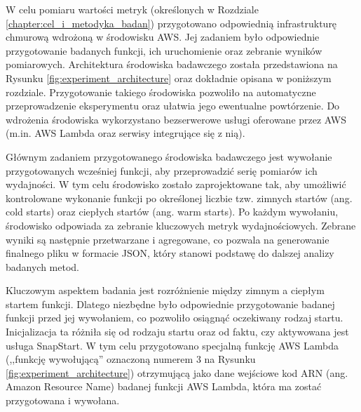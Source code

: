 W celu pomiaru wartości metryk (określonych w Rozdziale \ref{chapter:cel_i_metodyka_badan}) przygotowano odpowiednią infrastrukturę chmurową wdrożoną w środowisku AWS.
Jej zadaniem było odpowiednie przygotowanie badanych funkcji, ich uruchomienie oraz zebranie wyników pomiarowych.
Architektura środowiska badawczego została przedstawiona na Rysunku \ref{fig:experiment_architecture} oraz dokładnie opisana w poniższym rozdziale.
Przygotowanie takiego środowiska pozwoliło na automatyczne przeprowadzenie eksperymentu oraz ułatwia jego ewentualne powtórzenie.
Do wdrożenia środowiska wykorzystano bezserwerowe usługi oferowane przez AWS (m.in. AWS Lambda oraz serwisy integrujące się z nią).

Głównym zadaniem przygotowanego środowiska badawczego jest wywołanie przygotowanych wcześniej funkcji, aby przeprowadzić serię pomiarów ich wydajności.
W tym celu środowisko zostało zaprojektowane tak, aby umożliwić kontrolowane wykonanie funkcji po określonej liczbie tzw. zimnych startów (ang. cold starts) oraz ciepłych startów (ang. warm starts). 
Po każdym wywołaniu, środowisko odpowiada za zebranie kluczowych metryk wydajnościowych. 
Zebrane wyniki są następnie przetwarzane i agregowane, co pozwala na generowanie finalnego pliku w formacie JSON, który stanowi podstawę do dalszej analizy badanych metod.

Kluczowym aspektem badania jest rozróżnienie między zimnym a ciepłym startem funkcji.
Dlatego niezbędne było odpowiednie przygotowanie badanej funkcji przed jej wywołaniem, co pozwoliło osiągnąć oczekiwany rodzaj startu.
Inicjalizacja ta różniła się od rodzaju startu oraz od faktu, czy aktywowana jest usługa SnapStart.
W tym celu przygotowano specjalną funkcję AWS Lambda (,,funkcję wywołującą'' oznaczoną numerem 3 na Rysunku \ref{fig:experiment_architecture}) otrzymującą jako dane wejściowe kod ARN (ang. Amazon Resource Name) badanej funkcji AWS Lambda, która ma zostać przygotowana i wywołana.

